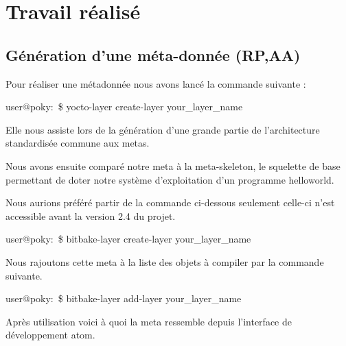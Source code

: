 
\chapter{Travail réalisé} %

\label{Chapter3} %


\section{Génération d'une méta-donnée (RP,AA)}

Pour réaliser une métadonnée nous avons lancé la commande suivante :

\begin{tcolorbox}
    user@poky:~\$ yocto-layer create-layer your\_layer\_name
\end{tcolorbox}

Elle nous assiste lors de la génération d’une grande partie de l’architecture standardisée
commune aux metas. \medskip 

Nous avons ensuite comparé notre meta à la meta-skeleton, le squelette de base
permettant de doter notre système d’exploitation d’un programme helloworld. \medskip 

Nous aurions préféré partir de la commande ci-dessous seulement celle-ci n’est
accessible avant la version 2.4 du projet.

\begin{tcolorbox}
    user@poky:~\$ bitbake-layer create-layer your\_layer\_name
\end{tcolorbox}

Nous rajoutons cette meta à la liste des objets à compiler par la commande suivante.

\begin{tcolorbox}
    user@poky:~\$ bitbake-layer add-layer your\_layer\_name
\end{tcolorbox}

Après utilisation voici à quoi la meta ressemble depuis l’interface de développement atom.

